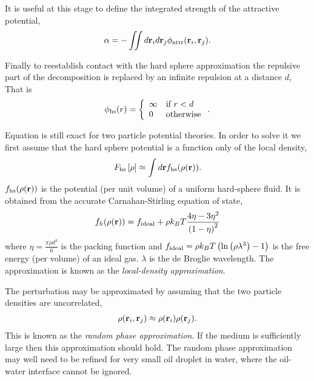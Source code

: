 It is useful at this stage to define the integrated strength of the attractive potential, 
\begin{align}
  \alpha =  - \iint d \textbf{r}_i d\textbf{r}_j \phi_{\text{attr}}( \textbf{r}_i, \textbf{r}_j).
  \label{eqn:nuc:alpha}
\end{align}

Finally to reestablish contact with the hard sphere approximation 
the repulsive part of the decomposition is replaced by an infinite repulsion at a distance $d$,
That is 
\begin{align}
  \phi_{\text{hs}}(r) = \left\{
    \begin{array}{ll}
      \infty & \text{if $r<d$}\\
      0 & \text{otherwise}
    \end{array} \right. .
\end{align}

Equation  is still exact for two particle potential theories.
In order to solve it we first  assume that the  hard sphere potential is a function only of the local density,
\begin{align}
  F_{\text{hs}} \left[ \rho \right] \approx \int d\textbf{r} f_{\text{hs}}(\rho(\textbf{r})). \label{eqn:LDA}
\end{align}
$f_{\text{hs}}(\rho(\textbf{r}))$ is the potential (per unit volume) of a uniform  hard-sphere fluid\cite{Evans1992}.
It is obtained from the accurate  Carnahan-Stirling equation of state,
\begin{align}
    f_h(\rho(\textbf{r})) =  f_{\text{ideal}} + \rho k_B T\frac{4\eta - 3\eta^2}{\left( 1-\eta \right)^2}
  \label{eqn:nuc:CS}
\end{align}
where $\eta =  \frac{\pi \rho d^3}{6}$ is the packing function and $f_{\text{ideal}} =  \rho k_B T\left( \ln \left( \rho \lambda^3 \right) -1 \right)$ is the free energy (per volume) of an ideal gas.
$\lambda$ is the de Broglie wavelength.
%
The approximation  is known as the {\em local-density approximation}.

The perturbation may be approximated by assuming that the two particle densities are uncorrelated, 
\begin{align}
\rho(\textbf{r}_i, \textbf{r}_j) \approx \rho(\textbf{r}_i)\rho(\textbf{r}_j).\label{eqn:RPA}
\end{align}
This is known as the {\em random phase approximation}.
If the medium is sufficiently large then this approximation should hold\cite{Evans1992}.
The random phase approximation may well need to be refined for very small oil droplet in water,  
where the oil-water interface cannot be ignored.

